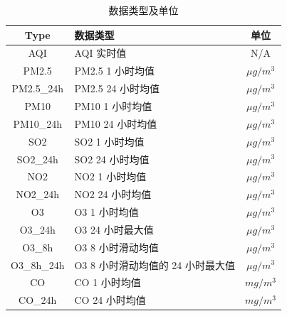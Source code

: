 \documentclass[12pt, a4paper, oneside]{ctexart}
\begin{document}
\begin{table}[h]
    \centering
    \caption{数据类型及单位}
    \label{tab:datatype}
    \begin{tabular}{|c|l|c|}
        \hline
        \textbf{Type}       & \textbf{数据类型}                        & \textbf{单位}          \\ \hline
        AQI                 & AQI 实时值                              & N/A                    \\ \hline
        PM2.5               & PM2.5 1 小时均值                        & $\mu g/m^3$            \\ \hline
        PM2.5\_24h          & PM2.5 24 小时均值                       & $\mu g/m^3$            \\ \hline
        PM10                & PM10 1 小时均值                         & $\mu g/m^3$            \\ \hline
        PM10\_24h           & PM10 24 小时均值                        & $\mu g/m^3$            \\ \hline
        SO2                 & SO2 1 小时均值                          & $\mu g/m^3$            \\ \hline
        SO2\_24h            & SO2 24 小时均值                         & $\mu g/m^3$            \\ \hline
        NO2                 & NO2 1 小时均值                          & $\mu g/m^3$            \\ \hline
        NO2\_24h            & NO2 24 小时均值                         & $\mu g/m^3$            \\ \hline
        O3                  & O3 1 小时均值                           & $\mu g/m^3$            \\ \hline
        O3\_24h             & O3 24 小时最大值                        & $\mu g/m^3$            \\ \hline
        O3\_8h              & O3 8 小时滑动均值                       & $\mu g/m^3$            \\ \hline
        O3\_8h\_24h         & O3 8 小时滑动均值的 24 小时最大值        & $\mu g/m^3$            \\ \hline
        CO                  & CO 1 小时均值                           & $mg/m^3$               \\ \hline
        CO\_24h             & CO 24 小时均值                          & $mg/m^3$               \\ \hline
    \end{tabular}
\end{table}
\newpage
\end{document}

